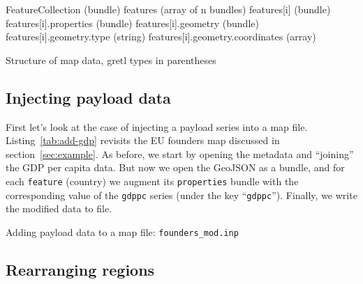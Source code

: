 \documentclass{article}
\begin{document}
\begin{script}[htbp]
\begin{scode}
FeatureCollection (bundle)
  features (array of n bundles)
    features[i] (bundle)
      features[i].properties (bundle)
      features[i].geometry   (bundle)
        features[i].geometry.type (string)
        features[i].geometry.coordinates (array)
\end{scode}
  \caption{Structure of map data, gretl types in parentheses}
  \label{tab:geojson}
\end{script}

\subsection{Injecting payload data}
\label{sec:inject}

First let's look at the case of injecting a payload series into a map
file. Listing~\ref{tab:add-gdp} revisits the EU founders map discussed
in section~\ref{sec:example}.  As before, we start by opening the
metadata and ``joining'' the GDP per capita data. But now we open the
GeoJSON as a bundle, and for each \texttt{feature} (country) we
augment its \texttt{properties} bundle with the corresponding value of
the \texttt{gdppc} series (under the key ``\texttt{gdppc}''). Finally,
we write the modified data to file.

\begin{script}[p]
  \caption{Adding payload data to a map file:
    \texttt{founders\_mod.inp}}
  \label{tab:add-gdp}
\end{script}

\subsection{Rearranging regions}
\label{sec:rearrange}
\end{document}
